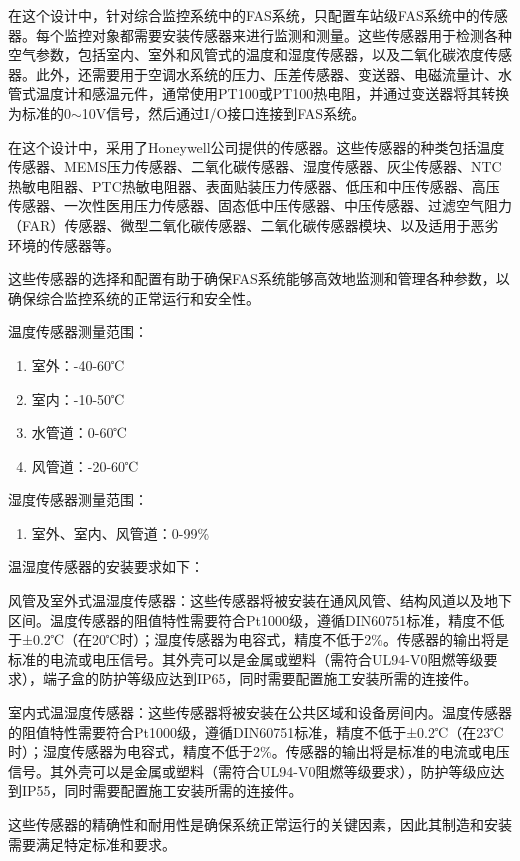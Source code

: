 在这个设计中，针对综合监控系统中的FAS系统，只配置车站级FAS系统中的传感器。每个监控对象都需要安装传感器来进行监测和测量。这些传感器用于检测各种空气参数，包括室内、室外和风管式的温度和湿度传感器，以及二氧化碳浓度传感器。此外，还需要用于空调水系统的压力、压差传感器、变送器、电磁流量计、水管式温度计和感温元件，通常使用PT100或PT100热电阻，并通过变送器将其转换为标准的0$\sim$10V信号，然后通过I/O接口连接到FAS系统。\par 
在这个设计中，采用了Honeywell公司提供的传感器。这些传感器的种类包括温度传感器、MEMS压力传感器、二氧化碳传感器、湿度传感器、灰尘传感器、NTC热敏电阻器、PTC热敏电阻器、表面贴装压力传感器、低压和中压传感器、高压传感器、一次性医用压力传感器、固态低中压传感器、中压传感器、过滤空气阻力（FAR）传感器、微型二氧化碳传感器、二氧化碳传感器模块、以及适用于恶劣环境的传感器等。\par 
这些传感器的选择和配置有助于确保FAS系统能够高效地监测和管理各种参数，以确保综合监控系统的正常运行和安全性。\par
温度传感器测量范围：\par 
\begin{enumerate}
	\item 室外：-40-60℃
	\item 室内：-10-50℃
	\item 水管道：0-60℃
	\item 风管道：-20-60℃
\end{enumerate}
\par 
湿度传感器测量范围：
\begin{enumerate}
	\item 室外、室内、风管道：0-99\%
\end{enumerate}
温湿度传感器的安装要求如下：\par 
风管及室外式温湿度传感器：这些传感器将被安装在通风风管、结构风道以及地下区间。温度传感器的阻值特性需要符合Pt1000级，遵循DIN60751标准，精度不低于±0.2℃（在20℃时）；湿度传感器为电容式，精度不低于2\%。传感器的输出将是标准的电流或电压信号。其外壳可以是金属或塑料（需符合UL94-V0阻燃等级要求），端子盒的防护等级应达到IP65，同时需要配置施工安装所需的连接件。\par
室内式温湿度传感器：这些传感器将被安装在公共区域和设备房间内。温度传感器的阻值特性需要符合Pt1000级，遵循DIN60751标准，精度不低于±0.2℃（在23℃时）；湿度传感器为电容式，精度不低于2\%。传感器的输出将是标准的电流或电压信号。其外壳可以是金属或塑料（需符合UL94-V0阻燃等级要求），防护等级应达到IP55，同时需要配置施工安装所需的连接件。\par 
这些传感器的精确性和耐用性是确保系统正常运行的关键因素，因此其制造和安装需要满足特定标准和要求。
